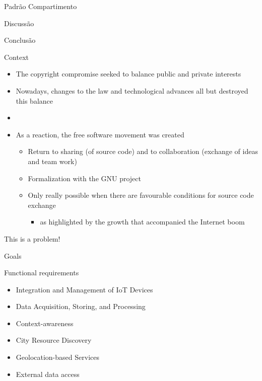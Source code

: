 \documentclass[xcolor={usenames,svgnames,dvipsnames},brazil,english,12pt,aspectratio=149]{beamer}
\begin{document}
\begin{frame}{Padrão Compartimento}
\end{frame}

\begin{frame}{Discussão}
\end{frame}

\begin{frame}{Conclusão}
\end{frame}

\begin{frame}{Context}
  \begin{itemize}
    \item The copyright compromise seeked to balance public and private interests
    \item Nowadays, changes to the law and technological advances all but destroyed this balance
    \item[]
    \item As a reaction, the free software movement was created
    \begin{itemize}
      \item Return to sharing (of source code) and to collaboration (exchange of ideas and team work)
      \item Formalization with the GNU project
      \item Only really possible when there are favourable conditions for source code exchange
      \begin{itemize}
        \item as highlighted by the growth that accompanied the Internet boom
      \end{itemize}
    \end{itemize}
  \end{itemize}

\end{frame}

\begin{frame}[standout]
	This is a problem!
\end{frame}

\begin{frame}{Goals}
  \begin{block}{Functional requirements}
    \begin{itemize}
      \item Integration and Management of \alert{IoT} Devices
      \item Data Acquisition, Storing, and Processing
      \item Context-awareness
      \item City Resource Discovery
      \item Geolocation-based Services
      \item External data access
    \end{itemize}
  \end{block}
\end{frame}
\end{document}
